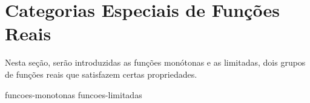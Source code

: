 \section{Categorias Especiais de Funções Reais}

Nesta seção, serão introduzidas as funções monótonas e as limitadas, dois grupos de funções reais que satisfazem certas propriedades.

{funcoes-monotonas}
{funcoes-limitadas}
